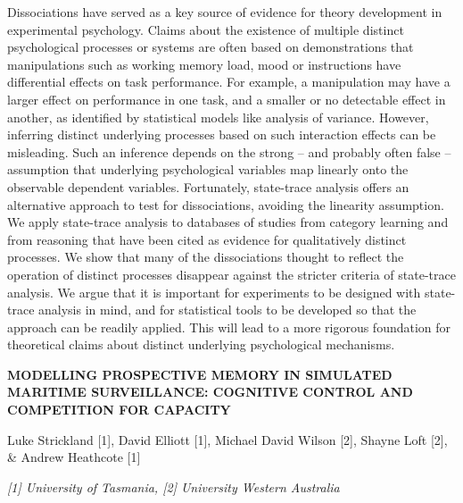 \documentclass[]{article}
\begin{document}
Dissociations have served as a key source of evidence for theory
development in experimental psychology. Claims about the existence of
multiple distinct psychological processes or systems are often based on
demonstrations that manipulations such as working memory load, mood or
instructions have differential effects on task performance. For example,
a manipulation may have a larger effect on performance in one task, and
a smaller or no detectable effect in another, as identified by
statistical models like analysis of variance. However, inferring
distinct underlying processes based on such interaction effects can be
misleading. Such an inference depends on the strong -- and probably
often false -- assumption that underlying psychological variables map
linearly onto the observable dependent variables. Fortunately,
state-trace analysis offers an alternative approach to test for
dissociations, avoiding the linearity assumption. We apply state-trace
analysis to databases of studies from category learning and from
reasoning that have been cited as evidence for qualitatively distinct
processes. We show that many of the dissociations thought to reflect the
operation of distinct processes disappear against the stricter criteria
of state-trace analysis. We argue that it is important for experiments
to be designed with state-trace analysis in mind, and for statistical
tools to be developed so that the approach can be readily applied. This
will lead to a more rigorous foundation for theoretical claims about
distinct underlying psychological mechanisms.

\textbf{MODELLING PROSPECTIVE MEMORY IN SIMULATED MARITIME SURVEILLANCE:
COGNITIVE CONTROL AND COMPETITION FOR CAPACITY}

Luke Strickland {[}1{]}, David Elliott {[}1{]}, Michael David Wilson
{[}2{]}, Shayne Loft {[}2{]}, \& Andrew Heathcote {[}1{]}

\emph{{[}1{]} University of Tasmania, {[}2{]} University Western
Australia}
\end{document}
